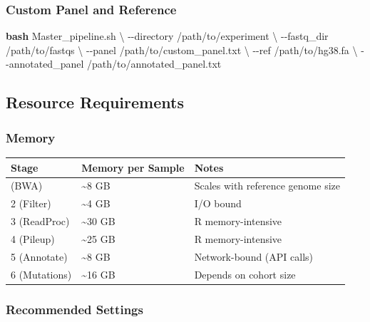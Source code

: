 \documentclass[
]{article}
\newenvironment{Shaded}{\begin{snugshade}}{\end{snugshade}}
\newcommand{\AttributeTok}[1]{\textcolor[rgb]{0.13,0.29,0.53}{#1}}
\newcommand{\DataTypeTok}[1]{\textcolor[rgb]{0.13,0.29,0.53}{#1}}
\newcommand{\FunctionTok}[1]{\textcolor[rgb]{0.13,0.29,0.53}{\textbf{#1}}}
\newcommand{\NormalTok}[1]{#1}
\newcounter{none} %
\begin{document}
\subsubsection{Custom Panel and
Reference}\label{custom-panel-and-reference}

\begin{Shaded}
\begin{Highlighting}[]
\FunctionTok{bash}\NormalTok{ Master\_pipeline.sh }\DataTypeTok{\textbackslash{}}
  \AttributeTok{{-}{-}directory}\NormalTok{ /path/to/experiment }\DataTypeTok{\textbackslash{}}
  \AttributeTok{{-}{-}fastq\_dir}\NormalTok{ /path/to/fastqs }\DataTypeTok{\textbackslash{}}
  \AttributeTok{{-}{-}panel}\NormalTok{ /path/to/custom\_panel.txt }\DataTypeTok{\textbackslash{}}
  \AttributeTok{{-}{-}ref}\NormalTok{ /path/to/hg38.fa }\DataTypeTok{\textbackslash{}}
  \AttributeTok{{-}{-}annotated\_panel}\NormalTok{ /path/to/annotated\_panel.txt}
\end{Highlighting}
\end{Shaded}

\subsection{Resource Requirements}\label{resource-requirements}

\subsubsection{Memory}\label{memory}

{\def\LTcaptype{none} %
\begin{longtable}[]{@{}lll@{}}
\toprule\noalign{}
Stage & Memory per Sample & Notes \\
\midrule\noalign{}
\endhead
\bottomrule\noalign{}
\endlastfoot
1 (BWA) & \textasciitilde8 GB & Scales with reference genome size \\
2 (Filter) & \textasciitilde4 GB & I/O bound \\
3 (ReadProc) & \textasciitilde30 GB & R memory-intensive \\
4 (Pileup) & \textasciitilde25 GB & R memory-intensive \\
5 (Annotate) & \textasciitilde8 GB & Network-bound (API calls) \\
6 (Mutations) & \textasciitilde16 GB & Depends on cohort size \\
\end{longtable}
}

\subsubsection{Recommended Settings}\label{recommended-settings}
\end{document}
